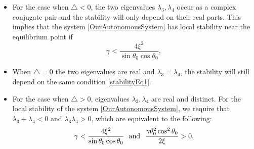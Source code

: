 \documentclass{UCF_ETD}
\begin{document}
\begin{itemize}


\item  %
  For the case when $\bigtriangleup < 0$, the two eigenvalues $\lambda_3, \lambda_4$ occur as a complex conjugate pair and the stability will only depend on their real parts.  %
  This implies that
  the system \eqref{OurAutonomousSystem} has local stability near the equilibrium point if
  \begin{equation} \label{stabilityEq1}
\gamma < \frac{4\xi^2}{\sin\theta_0\cos\theta_0},
\end{equation}

\item 
When $\bigtriangleup = 0$ the two eigenvalues are real and $\lambda_3 = \lambda_4$, the stability will still depend on the same condition \eqref{stabilityEq1}.

 \item  %
  For the case when $\bigtriangleup > 0$, eigenvalues $\lambda_3 , \lambda_4$ are real and distinct. 
  For the local stability of  the system \eqref{OurAutonomousSystem}, we require that $\lambda_3+\lambda_4<0$ and $\lambda_3\lambda_4>0$, which are equivalent to the following:
    \begin{equation*} \label{stabilityEq2}
\gamma < \frac{4\xi^2}{\sin\theta_0\cos\theta_0}\ \ {\rm and}\  \
\frac{\gamma\theta_0^2 \cos^2\theta_0}{2\xi} > 0.
\end{equation*}

\end{itemize}
\end{document}
